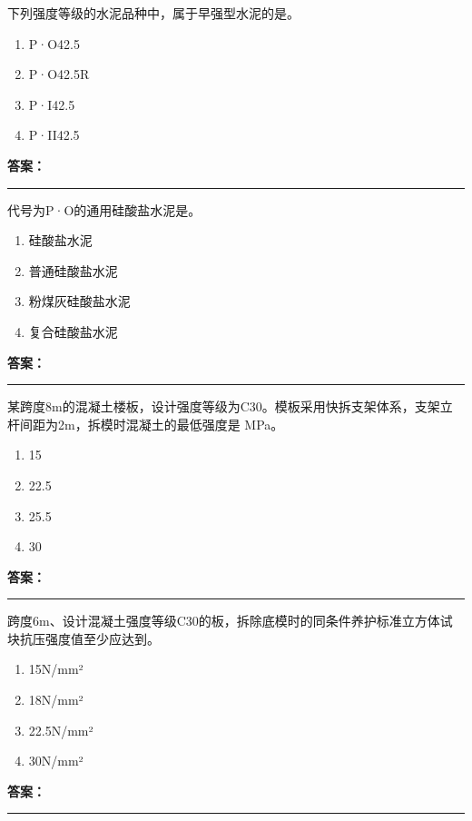 \documentclass[UTF8,fontset=fandol,11pt]{ctexart}
\newcommand{\answerline}{\textcolor{answerred}{\rule{2.4cm}{0.7pt}}}
\begin{document}
\begin{quizbox}[title={第 35 题}]
下列强度等级的水泥品种中，属于早强型水泥的是。\\
\begin{enumerate}[label=\Alph*.]
\item P·O42.5
\item P·O42.5R
\item P·I42.5
\item P·II42.5
\end{enumerate}
\textbf{\textcolor{answerred}{答案：}} \answerline
\end{quizbox}

\vspace{0.2em}

\begin{quizbox}[title={第 36 题}]
代号为P·O的通用硅酸盐水泥是。\\
\begin{enumerate}[label=\Alph*.]
\item 硅酸盐水泥
\item 普通硅酸盐水泥
\item 粉煤灰硅酸盐水泥
\item 复合硅酸盐水泥
\end{enumerate}
\textbf{\textcolor{answerred}{答案：}} \answerline
\end{quizbox}

\vspace{0.2em}

\begin{quizbox}[title={第 37 题}]
某跨度8m的混凝土楼板，设计强度等级为C30。模板采用快拆支架体系，支架立杆间距为2m，拆模时混凝土的最低强度是 MPa。\\
\begin{enumerate}[label=\Alph*.]
\item 15
\item 22.5
\item 25.5
\item 30
\end{enumerate}
\textbf{\textcolor{answerred}{答案：}} \answerline
\end{quizbox}

\vspace{0.2em}

\begin{quizbox}[title={第 38 题}]
跨度6m、设计混凝土强度等级C30的板，拆除底模时的同条件养护标准立方体试块抗压强度值至少应达到。\\
\begin{enumerate}[label=\Alph*.]
\item 15N/mm²
\item 18N/mm²
\item 22.5N/mm²
\item 30N/mm²
\end{enumerate}
\textbf{\textcolor{answerred}{答案：}} \answerline
\end{quizbox}
\end{document}
